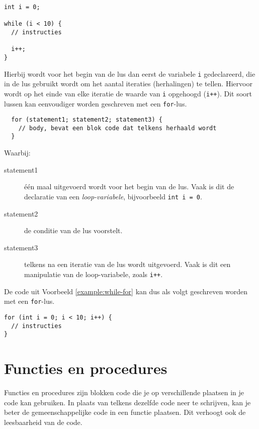 \documentclass[11pt,fleqn]{book} %
\begin{document}
\begin{example}
	\label{example:while-for}
	\phantom{ }
	\begin{verbatim}
int i = 0;

while (i < 10) {
  // instructies
  
  i++;
}
	\end{verbatim}
\end{example}
\noindent
Hierbij wordt voor het begin van de lus dan eerst de variabele \texttt{i} gedeclareerd, die in de lus gebruikt wordt om het aantal iteraties (herhalingen) te tellen. Hiervoor wordt op het einde van elke iteratie de waarde van \texttt{i} opgehoogd (\texttt{i++}). Dit soort lussen kan eenvoudiger worden geschreven met een \texttt{for}-lus.

\begin{definition}[For]
	\phantom{ }
	\begin{verbatim}
  for (statement1; statement2; statement3) {
    // body, bevat een blok code dat telkens herhaald wordt
  }
	\end{verbatim}
	Waarbij:
	\begin{description}
		\item[statement1] één maal uitgevoerd wordt voor het begin van de lus. Vaak is dit de declaratie van een \emph{loop-variabele}, bijvoorbeeld \texttt{int i = 0}.
		\item[statement2] de conditie van de lus voorstelt.
		\item[statement3] telkens na een iteratie van de lus wordt uitgevoerd. Vaak is dit een manipulatie van de loop-variabele, zoals \texttt{i++}.
	\end{description}
\end{definition}
\noindent
De code uit Voorbeeld \ref{example:while-for} kan dus als volgt geschreven worden met een \texttt{for}-lus.

\begin{example}
	\phantom{ }
	\begin{verbatim}
for (int i = 0; i < 10; i++) {
  // instructies
}
	\end{verbatim}
\end{example}

\chapter{Functies en procedures}
Functies en procedures zijn blokken code die je op verschillende plaatsen in je code kan gebruiken. In plaats van telkens dezelfde code neer te schrijven, kan je beter de gemeenschappelijke code in een functie plaatsen. Dit verhoogt ook de leesbaarheid van de code.
\end{document}
